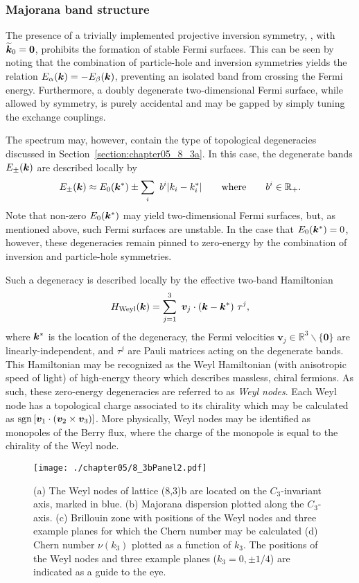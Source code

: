 %
\subsubsection{Majorana band structure}
%
The presence of a trivially implemented projective inversion symmetry, \ie, with $\widetilde{\bm{k}}_0 = \bm{0}$, prohibits the formation of stable Fermi surfaces.
This can be seen by noting that the combination of particle-hole and inversion symmetries yields the relation $E_{\alpha}(\bm{k}) = - E_{\beta}(\bm{k})$, preventing an isolated band from crossing the Fermi energy.
Furthermore, a doubly degenerate two-dimensional Fermi surface, while allowed by symmetry, is purely accidental and may be gapped by simply tuning the exchange couplings.

The spectrum may, however, contain the type of topological degeneracies discussed in Section~\ref{section:chapter05_8_3a}.
In this case, the degenerate bands $E_{\pm}(\bm{k})$ are described locally by
%
\begin{equation}
	E_{\pm}(\bm{k}) \approx E_0(\bm{k}^*) \pm \sum_i~b^i |k_i - k^*_i| \qquad {\rm where } \qquad b^i \in \mathbb{R}_{+}.
\end{equation}
%
Note that non-zero $E_0(\bm{k}^*)$ may yield two-dimensional Fermi surfaces, but, as mentioned above, such Fermi surfaces are unstable.
In the case that $E_0(\bm{k}^*) = 0$, however, these degeneracies remain pinned to zero-energy by the combination of inversion and particle-hole symmetries.

Such a degeneracy is described locally by the effective two-band Hamiltonian
%
\begin{equation}
	H_{\rm Weyl}(\bm{k}) = \sum_{j=1}^{3}~ \bm{v}_j \cdot (\bm{k} - \bm{k}^*)~\tau^j,
	\label{eq:chapter05_WeylHamiltonian}
\end{equation}
%
where $\bm{k}^*$ is the location of the degeneracy, the Fermi velocities $\bm{v}_j \in \mathbb{R}^3\backslash\{\bm{0}\}$ are linearly-independent, and $\tau^j$ are Pauli matrices acting on the degenerate bands.
This Hamiltonian may be recognized as the Weyl Hamiltonian (with anisotropic speed of light) of high-energy theory which describes massless, chiral fermions.
As such, these zero-energy degeneracies are referred to as \textit{Weyl nodes}.
Each Weyl node has a topological charge associated to its chirality which may be calculated as $\operatorname{sgn}{[\bm{v}_1 \cdot (\bm{v}_2 \times \bm{v}_3)]}$.
More physically, Weyl nodes may be identified as monopoles of the Berry flux, where the charge of the monopole is equal to the chirality of the Weyl node.
%
\begin{figure}[tb]
	\centering
	\texttt{[image: ./chapter05/8\_3bPanel2.pdf]}
	\caption{
		(a) The Weyl nodes of lattice (8,3)b are located on the $C_3$-invariant axis, marked in blue.
		(b) Majorana dispersion plotted along the $C_3$-axis.
		(c) Brillouin zone with positions of the Weyl nodes and three example planes for which the Chern number may be calculated
		(d) Chern number $\nu(k_3)$ plotted as a function of $k_3$.
		The positions of the Weyl nodes and three example planes  ($k_3 = 0, \pm 1/4$) are indicated as a guide to the eye.
	}
	\label{fig:chapter05_8_3bPanel2}
\end{figure}
%

